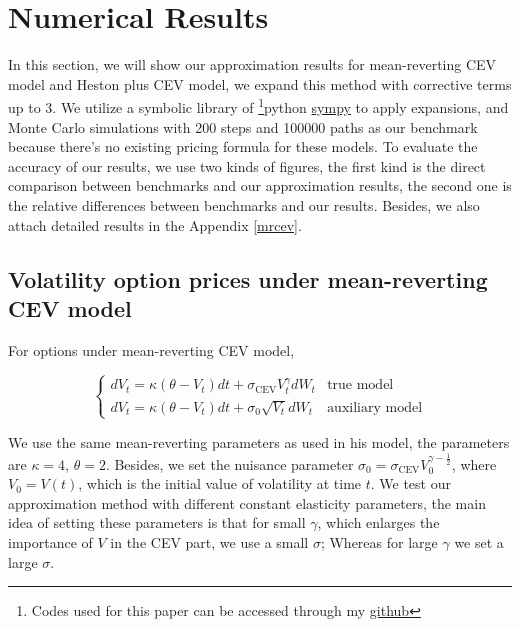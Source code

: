 \chapter{Numerical Results}

In this section, we will show our approximation results for mean-reverting CEV model and Heston plus CEV model, we expand this method with corrective terms up to 3. We utilize a symbolic library of \footnote{Codes used for this paper can be accessed through my \href{https://github.com/ywang408/master-thesis-code}{github}}{python} \href{https://www.sympy.org/en/index.html}{sympy} to apply expansions, and Monte Carlo simulations with 200 steps and 100000 paths as our benchmark because there's no existing pricing formula for these models. To evaluate the accuracy of our results, we use two kinds of figures, the first kind is the direct comparison between benchmarks and our approximation results, the second one is the relative differences between benchmarks and our results. Besides, we also attach detailed results in the Appendix \ref{mrcev}.

\section{Volatility option prices under mean-reverting CEV model}

For options under mean-reverting CEV model,

$$
  \begin{cases}
    d V_t=\kappa(\theta - V_t) d t+\sigma_{\text{CEV}} V^{\gamma}_t d W_t &\text{true model}\\
    d V_t=\kappa(\theta - V_t) d t+\sigma_0 \sqrt{V_t} d W_t &\text{auxiliary model}
  \end{cases}
$$

We use the same mean-reverting parameters as \cite{grunbichler_valuing_1996} used in his model, the parameters are $\kappa=4$, $\theta=2$. Besides, we set the nuisance parameter $\sigma_0 = \sigma_{\text{CEV}} V_0^{\gamma-\frac{1}{2}}$, where $V_0=V(t)$, which is the initial value of volatility at time $t$. We test our approximation method with different constant elasticity parameters, the main idea of setting these parameters is that for small $\gamma$, which enlarges the importance of $V$ in the CEV part, we use a small $\sigma$; Whereas for large $\gamma$ we set a large $\sigma$. 


